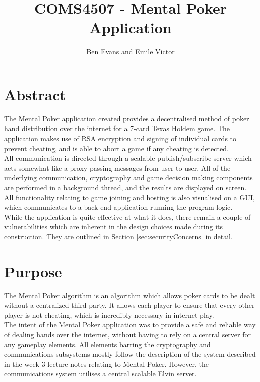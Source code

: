 \documentclass[11pt, oneside]{article}   	%
\title{COMS4507 - Mental Poker Application}
\author{Ben Evans and Emile Victor}
\begin{document}
\maketitle

\section{Abstract}

The Mental Poker application created provides a decentralised method of poker hand distribution over the internet for a 7-card Texas Holdem game. The application makes use of RSA encryption and signing of individual cards to prevent cheating, and is able to abort a game if any cheating is detected.\\
					
All communication is directed through a scalable publish/subscribe server which acts somewhat like a proxy passing messages from user to user. All of the underlying communication, cryptography and game decision making components are performed in a background thread, and the results are displayed on screen. All functionality relating to game joining and hosting is also visualised on a GUI, which communicates to a back-end application running the program logic.\\
					
While the application is quite effective at what it does, there remain a couple of vulnerabilities which are inherent in the design choices made during its construction. They are outlined in Section \ref{sec:securityConcerns} in detail.

\section {Purpose}

The Mental Poker algorithm is an algorithm which allows poker cards to be dealt without a centralized third party. It allows each player to ensure that every other player is not cheating, which is incredibly necessary in internet play. \\

The intent of the Mental Poker application was to provide a safe and reliable way of dealing hands over the internet, without having to rely on a central server for any gameplay elements. All elements barring the cryptography and communications subsystems mostly follow the description of the system described in the week 3 lecture notes relating to Mental Poker. However, the communications system utilises a central scalable Elvin server.\\
\end{document}
